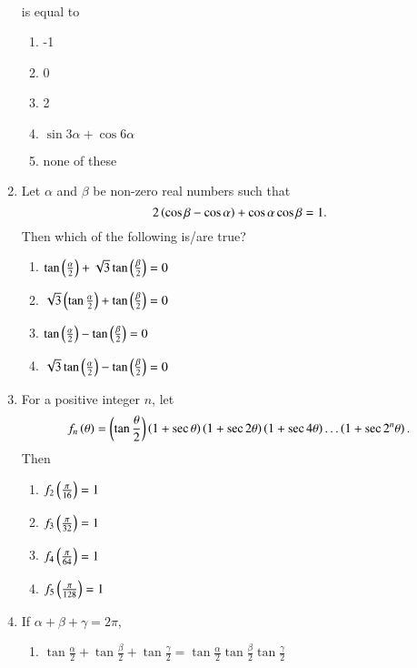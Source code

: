 \begin{enumerate}[label=\thesubsection.\arabic*,ref=\thesubsection.\theenumi]
\begin{align*}
\end{align*}
is equal to
\hfill{}
\begin{multicols}{2}
\begin{enumerate}
\item -1
\item 0
\item 2
\item $\sin3\alpha + \cos6\alpha$
\item none of these
\end{enumerate}
\end{multicols}
\item Let $\alpha$ and $\beta$ be non-zero real numbers such that 
\hfill{}
	$$2\left(\cos \beta - \cos \alpha\right)+\cos \alpha \cos \beta=1.$$ Then which of the following is/are true? 
\begin{multicols}{2}
\begin{enumerate}
    \item $\tan{\ensuremath{\left(\frac{\alpha}{2}\right)}+\sqrt{3}\tan\ensuremath{\left(\frac{\beta}{2}\right)}}=0$
    \item $\sqrt{3}\left(\tan{\frac{\alpha}{2}}\right)+\tan\left({\frac{\beta}{2}}\right)=0$
    \item $\tan{\ensuremath{\left(\frac{\alpha}{2}\right)}}-\tan{\ensuremath{\left(\frac{\beta}{2}\right)}}=0$
    \item $\sqrt{3}\tan{\ensuremath{\left(\frac{\alpha}{2}\right)}}-\tan{\ensuremath{\left(\frac{\beta}{2}\right)}}=0$
\end{enumerate}
\end{multicols}
\item For a positive integer $n$, let  
\hfill{}
$$f_n\left(\theta\right) = \left(\tan\frac{\theta}{2}\right)\left(1+\sec{\theta}\right)\left(1+\sec{2\theta}\right)\left(1+\sec4\theta\right)\dots\left(1+\sec2^n{\theta}\right).$$ Then  
\begin{multicols}{4}
\begin{enumerate}
    \item $f_2\left(\frac{\pi}{16}\right) = 1$
    \item $f_3\left(\frac{\pi}{32}\right) = 1$
    \item $f_4\left(\frac{\pi}{64}\right) = 1$
    \item $f_5\left(\frac{\pi}{128}\right) = 1$
\end{enumerate}
\end{multicols}
%
%  
	\item If $\alpha+ \beta +\gamma = 2\pi$, 
		\hfill{}
%  
\begin{enumerate}
%  
%  
			\item $\tan\frac{\alpha}{2} + \tan\frac{\beta}{2} + \tan\frac{\gamma}{2} = \tan\frac{\alpha}{2}\tan\frac{\beta}{2}\tan\frac{\gamma}{2}$

\end{enumerate}
\end{enumerate}
